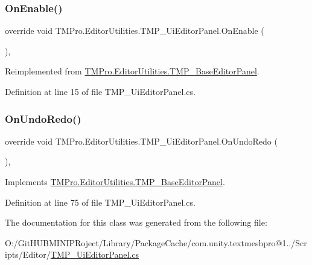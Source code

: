 \subsubsection{\texorpdfstring{OnEnable()}{OnEnable()}}
{\footnotesize\ttfamily override void T\+M\+Pro.\+Editor\+Utilities.\+T\+M\+P\+\_\+\+Ui\+Editor\+Panel.\+On\+Enable (\begin{DoxyParamCaption}{ }\end{DoxyParamCaption})\hspace{0.3cm}{\ttfamily [protected]}, {\ttfamily [virtual]}}



Reimplemented from \mbox{\hyperlink{class_t_m_pro_1_1_editor_utilities_1_1_t_m_p___base_editor_panel_a3a60309b317f09709852e0c8013e6849}{T\+M\+Pro.\+Editor\+Utilities.\+T\+M\+P\+\_\+\+Base\+Editor\+Panel}}.



Definition at line 15 of file T\+M\+P\+\_\+\+Ui\+Editor\+Panel.\+cs.

\mbox{\label{class_t_m_pro_1_1_editor_utilities_1_1_t_m_p___ui_editor_panel_ae144f22de63b6a77615fde93e9b047a7}} 
\subsubsection{\texorpdfstring{OnUndoRedo()}{OnUndoRedo()}}
{\footnotesize\ttfamily override void T\+M\+Pro.\+Editor\+Utilities.\+T\+M\+P\+\_\+\+Ui\+Editor\+Panel.\+On\+Undo\+Redo (\begin{DoxyParamCaption}{ }\end{DoxyParamCaption})\hspace{0.3cm}{\ttfamily [protected]}, {\ttfamily [virtual]}}



Implements \mbox{\hyperlink{class_t_m_pro_1_1_editor_utilities_1_1_t_m_p___base_editor_panel_a03f1303365c95a93f4fae9cb11af7df7}{T\+M\+Pro.\+Editor\+Utilities.\+T\+M\+P\+\_\+\+Base\+Editor\+Panel}}.



Definition at line 75 of file T\+M\+P\+\_\+\+Ui\+Editor\+Panel.\+cs.



The documentation for this class was generated from the following file\+:\begin{DoxyCompactItemize}
\item 
O\+:/\+Git\+H\+U\+B\+M\+I\+N\+I\+P\+Roject/\+Library/\+Package\+Cache/com.\+unity.\+textmeshpro@1../\+Scripts/\+Editor/\mbox{\hyperlink{_t_m_p___ui_editor_panel_8cs}{T\+M\+P\+\_\+\+Ui\+Editor\+Panel.\+cs}}\end{DoxyCompactItemize}
